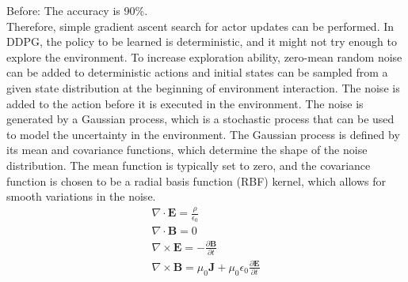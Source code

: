 \begin{revisebox}{3.2} %
    Before: The accuracy is 90\%. \\
    Therefore, simple gradient ascent search for actor updates can be performed.
    In DDPG, the policy to be learned is deterministic, and it might not try
    enough to explore the environment. To increase exploration ability,
    zero-mean random noise can be added to deterministic actions and initial
    states can be sampled from a given state distribution at the beginning
    of environment interaction. The noise is added to the action before it
    is executed in the environment. The noise is generated by a Gaussian process,
    which is a stochastic process that can be used to model the uncertainty in the environment.
    The Gaussian process is defined by its mean and covariance functions,
    which determine the shape of the noise distribution. The mean function is typically set to zero,
    and the covariance function is chosen to
    be a radial basis function (RBF) kernel, which allows for smooth variations in the noise.
    \begin{gather}
        \nabla \cdot \mathbf{E} = \frac{\rho}{\epsilon_0} \\
        \nabla \cdot \mathbf{B} = 0 \\
        \nabla \times \mathbf{E} = -\frac{\partial \mathbf{B}}{\partial t} \\
        \nabla \times \mathbf{B} = \mu_0 \mathbf{J} + \mu_0 \epsilon_0 \frac{\partial \mathbf{E}}{\partial t}
    \end{gather}
\end{revisebox}




